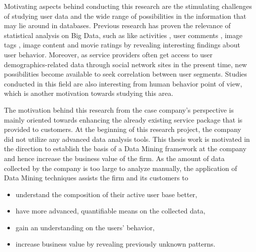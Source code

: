     Motivating aspects behind conducting this research are the stimulating challenges of studying user data and the wide range of possibilities in the information that may lie around in databases. Previous research has proven the relevance of statistical analysis on Big Data, such as like activities \cite{jang2015noreciprocity, jang2016teensengagemorewithfewerphotos, ottoni2013ladies, guy2016whatsyourorganizationlike, jang2015no, youyou2015computer}, user comments \cite{jang2016teensengagemorewithfewerphotos}, image tags \cite{jang2016teensengagemorewithfewerphotos}, image content \cite{hu2014we, bakhshi2014faces} and movie ratings \cite{saraee2004data, kabinsingha2012movie} by revealing interesting findings about user behavior. Moreover, as service providers often get access to user demographics-related data through social network sites in the present time, new possibilities become available to seek correlation between user segments. Studies conducted in this field are also interesting from human behavior point of view, which is another motivation towards studying this area. 

    The motivation behind this research from the case company's perspective is mainly oriented towards enhancing the already existing service package that is provided to customers. At the beginning of this research project, the company did not utilize any advanced data analysis tools. This thesis work is motivated in the direction to establish the basis of a Data Mining framework at the company and hence increase the business value of the firm. As the amount of data collected by the company is too large to analyze manually, the application of Data Mining techniques assists the firm and its customers to 

    \begin{itemize}
        \item understand the composition of their active user base better,
        \item have more advanced, quantifiable means on the collected data,
        \item gain an understanding on the users' behavior, 
        \item increase business value by revealing previously unknown patterns.
    \end{itemize} 

\pagebreak

